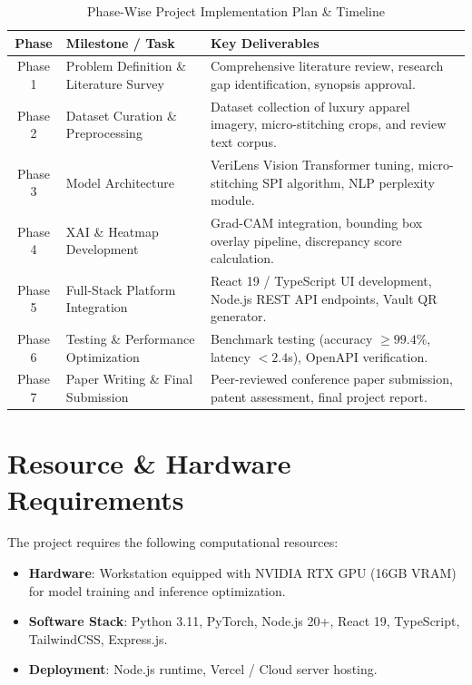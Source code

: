 \documentclass[a4paper,12pt]{report}
\begin{document}
\begin{table}[htbp]
\centering
\caption{Phase-Wise Project Implementation Plan \& Timeline}
\label{tab:project_plan}
\small
\begin{tabularx}{\textwidth}{c >{\raggedright\arraybackslash}p{4.5cm} >{\raggedright\arraybackslash}p{6.0cm}}
\toprule
\textbf{Phase} & \textbf{Milestone / Task} & \textbf{Key Deliverables} \\
\midrule
Phase 1 & Problem Definition \& Literature Survey & Comprehensive literature review, research gap identification, synopsis approval. \\
\addlinespace
Phase 2 & Dataset Curation \& Preprocessing & Dataset collection of luxury apparel imagery, micro-stitching crops, and review text corpus. \\
\addlinespace
Phase 3 & Model Architecture & VeriLens Vision Transformer tuning, micro-stitching SPI algorithm, NLP perplexity module. \\
\addlinespace
Phase 4 & XAI \& Heatmap Development & Grad-CAM integration, bounding box overlay pipeline, discrepancy score calculation. \\
\addlinespace
Phase 5 & Full-Stack Platform Integration & React 19 / TypeScript UI development, Node.js REST API endpoints, Vault QR generator. \\
\addlinespace
Phase 6 & Testing \& Performance Optimization & Benchmark testing (accuracy $\ge 99.4\%$, latency $<2.4$s), OpenAPI verification. \\
\addlinespace
Phase 7 & Paper Writing \& Final Submission & Peer-reviewed conference paper submission, patent assessment, final project report. \\
\bottomrule
\end{tabularx}
\end{table}

\section{Resource \& Hardware Requirements}
The project requires the following computational resources:
\begin{itemize}
    \item \textbf{Hardware}: Workstation equipped with NVIDIA RTX GPU (16GB VRAM) for model training and inference optimization.
    \item \textbf{Software Stack}: Python 3.11, PyTorch, Node.js 20+, React 19, TypeScript, TailwindCSS, Express.js.
    \item \textbf{Deployment}: Node.js runtime, Vercel / Cloud server hosting.
\end{itemize}

\newpage
{}
\printbibliography
\end{document}
